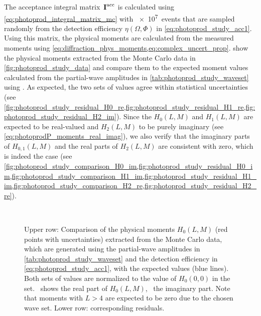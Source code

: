 The acceptance integral matrix~$\bm{\mathrm{I}}^\text{acc}$ is calculated
using \cref{eq:photoprod_integral_matrix_mc} with \num{e7}~events that
are sampled randomly from the detection efficiency $\eta(\Omega,
\Phi)$ in \cref{eq:photoprod_study_acc1}.  Using this matrix, the
physical moments are calculated from the measured moments using
\cref{eq:diffraction_phys_moments,eq:complex_uncert_prop}.
show the physical moments extracted from the Monte Carlo data in
\cref{fig:photoprod_study_data} and compare them to the expected
moment values calculated from the partial-wave amplitudes in
\cref{tab:photoprod_study_waveset} using
.
As expected, the two sets of values  agree within statistical
uncertainties (see
\cref{fig:photoprod_study_residual_H0_re,fig:photoprod_study_residual_H1_re,fig:photoprod_study_residual_H2_im}).
Since the $H_0(L, M)$ and $H_1(L, M)$ are expected to be real-valued
and $H_2(L, M)$ to be purely imaginary (see
\cref{eq:photoprodP_moments_real_imag}), we also verify that the
imaginary parts of $H_{0, 1}(L, M)$ and the real parts of $H_2(L, M)$
are consistent with zero, which is indeed the case (see
\cref{fig:photoprod_study_comparison_H0_im,fig:photoprod_study_residual_H0_im,fig:photoprod_study_comparison_H1_im,fig:photoprod_study_residual_H1_im,fig:photoprod_study_comparison_H2_re,fig:photoprod_study_residual_H2_re}).

\begin{figure}[tbp]
  \centering%
  \\%
  \caption{Upper row: Comparison of the physical moments $H_0(L, M)$
  (red points with uncertainties) extracted from the Monte Carlo data,
  which are generated using the partial-wave amplitudes in
  \cref{tab:photoprod_study_waveset} and the detection efficiency in
  \cref{eq:photoprod_study_acc1}, with the expected values (blue
  lines).  Both sets of values are normalized to the value of $H_0(0,
  0)$ in the set.
  ~shows the real
  part of $H_0(L, M)$,
  ~the imaginary
  part.  Note that moments with $L > 4$ are expected to be zero due to
  the chosen wave set.  Lower row: corresponding residuals.}%
  \label{fig:photoprod_study_output_H0}%
\end{figure}

